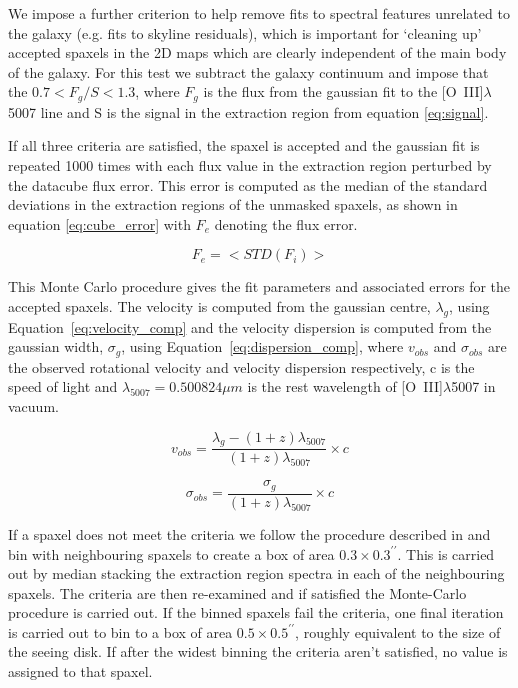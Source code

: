 \documentclass[fleqn,usenatbib]{mn2e}
\begin{document}
We impose a further criterion to help remove fits to spectral features unrelated to the galaxy (e.g. fits to skyline residuals), which is important for `cleaning up' accepted spaxels in the 2D maps which are clearly independent of the main body of the galaxy. For this test we subtract the galaxy continuum and impose that the $0.7 < F_{g}/{S} < 1.3$, where $F_{g}$ is the flux from the gaussian fit to the [O~{\sc III}]$\lambda$5007 line and S is the signal in the extraction region from equation \ref{eq:signal}.

If all three criteria are satisfied, the spaxel is accepted and the gaussian fit is repeated 1000 times with each flux value in the extraction region perturbed by the datacube flux error.
This error is computed as the median of the standard deviations in the extraction regions of the unmasked spaxels, as shown in equation \ref{eq:cube_error} with $F_{e}$ denoting the flux error.  

\begin{equation}\label{eq:cube_error}
   F_{e} = \big<STD(F _{i})\big>
\end{equation}

This Monte Carlo procedure gives the fit parameters and associated errors for the accepted spaxels.
The velocity is computed from the gaussian centre, $\lambda_{g}$, using Equation~\ref{eq:velocity_comp} and the velocity dispersion is computed from the gaussian width, $\sigma_{g}$, using Equation~\ref{eq:dispersion_comp}, where $v_{obs}$ and $\sigma_{obs}$ are the observed rotational velocity and velocity dispersion respectively, c is the speed of light and $\lambda_{5007} = 0.500824\mu m$ is the rest wavelength of [O~{\sc III}]$\lambda$5007 in vacuum.

\begin{equation}\label{eq:velocity_comp}
   v_{obs} = \frac{\lambda_{g} - (1 + z)\lambda_{5007}}{(1 + z)\lambda_{5007}} \times c
\end{equation}

\begin{equation}\label{eq:dispersion_comp}
   \sigma_{obs} = \frac{\sigma_{g}}{(1 + z)\lambda_{5007}} \times c
\end{equation}

If a spaxel does not meet the criteria we follow the procedure described in \cite{Stott2016} and bin with neighbouring spaxels to create a box of area $0.3\times0.3^{\prime\prime}$.
This is carried out by median stacking the extraction region spectra in each of the neighbouring spaxels.
The criteria are then re-examined and if satisfied the Monte-Carlo procedure is carried out. 
If the binned spaxels fail the criteria, one final iteration is carried out to bin to a box of area $0.5\times0.5^{\prime\prime}$, roughly equivalent to the size of the seeing disk.
If after the widest binning the criteria aren't satisfied, no value is assigned to that spaxel.
\end{document}
